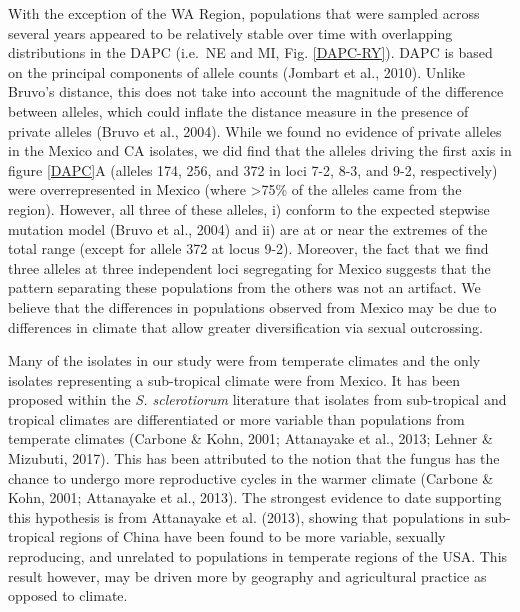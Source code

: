 \documentclass[fleqn,10pt,lineno]{wlpeerj} %
\theoremstyle{definition}
\theoremstyle{definition}
\theoremstyle{definition}
\theoremstyle{remark}
\begin{document}
With the exception of the WA Region, populations that were sampled
across several years appeared to be relatively stable over time with
overlapping distributions in the DAPC (i.e.~NE and MI, Fig.
\ref{DAPC-RY}). DAPC is based on the principal components of allele
counts (Jombart et al., 2010). Unlike Bruvo's distance, this does not
take into account the magnitude of the difference between alleles, which
could inflate the distance measure in the presence of private alleles
(Bruvo et al., 2004). While we found no evidence of private alleles in
the Mexico and CA isolates, we did find that the alleles driving the
first axis in figure \ref{DAPC}A (alleles 174, 256, and 372 in loci 7-2,
8-3, and 9-2, respectively) were overrepresented in Mexico (where
\textgreater{}75\% of the alleles came from the region). However, all
three of these alleles, i) conform to the expected stepwise mutation
model (Bruvo et al., 2004) and ii) are at or near the extremes of the
total range (except for allele 372 at locus 9-2). Moreover, the fact
that we find three alleles at three independent loci segregating for
Mexico suggests that the pattern separating these populations from the
others was not an artifact. We believe that the differences in
populations observed from Mexico may be due to differences in climate
that allow greater diversification via sexual outcrossing.

Many of the isolates in our study were from temperate climates and the
only isolates representing a sub-tropical climate were from Mexico. It
has been proposed within the \emph{S. sclerotiorum} literature that
isolates from sub-tropical and tropical climates are differentiated or
more variable than populations from temperate climates (Carbone \& Kohn,
2001; Attanayake et al., 2013; Lehner \& Mizubuti, 2017). This has been
attributed to the notion that the fungus has the chance to undergo more
reproductive cycles in the warmer climate (Carbone \& Kohn, 2001;
Attanayake et al., 2013). The strongest evidence to date supporting this
hypothesis is from Attanayake et al. (2013), showing that populations in
sub-tropical regions of China have been found to be more variable,
sexually reproducing, and unrelated to populations in temperate regions
of the USA. This result however, may be driven more by geography and
agricultural practice as opposed to climate.
\end{document}
